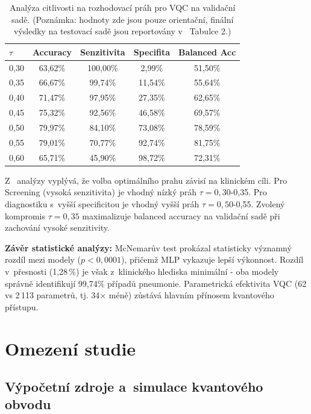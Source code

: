 \documentclass[12pt, a4paper]{report}
\begin{document}
\begin{table}[htbp]
    \centering
    \caption{Analýza citlivosti na rozhodovací práh pro VQC na validační sadě. (Poznámka: hodnoty zde jsou pouze orientační, finální výsledky na testovací sadě jsou reportovány v ~Tabulce 2.)}
    \label{tab:threshold_sensitivity}
    \begin{tabular}{|l|c|c|c|c|}
        \hline
        \textbf{$\tau$} & \textbf{Accuracy} & \textbf{Senzitivita} & \textbf{Specifita} & \textbf{Balanced Acc} \\
        \hline
        0{,}30 & 63{,}62\% & 100{,}00\% & 2{,}99\% & 51{,}50\% \\ \hline
        0{,}35 & 66{,}67\% & 99{,}74\% & 11{,}54\% & 55{,}64\% \\ \hline
        0{,}40 & 71{,}47\% & 97{,}95\% & 27{,}35\% & 62{,}65\% \\ \hline
        0{,}45 & 75{,}32\% & 92{,}56\% & 46{,}58\% & 69{,}57\% \\ \hline
        0{,}50 & 79{,}97\% & 84{,}10\% & 73{,}08\% & 78{,}59\% \\ \hline
        0{,}55 & 79{,}01\% & 70{,}77\% & 92{,}74\% & 81{,}75\% \\ \hline
        0{,}60 & 65{,}71\% & 45{,}90\% & 98{,}72\% & 72{,}31\% \\
    \end{tabular}
\end{table}

Z ~analýzy vyplývá, že volba optimálního prahu závisí na klinickém cíli. Pro Screening (vysoká senzitivita) je vhodný nízký práh $\tau = 0{,}30$-0{,}35. Pro diagnostiku s~vyšší specificitou je vhodný vyšší práh $\tau = 0{,}50$-0{,}55. Zvolený kompromis $\tau = 0{,}35$ maximalizuje balanced accuracy na validační sadě při zachování vysoké senzitivity.

\textbf{Závěr statistické analýzy:} McNemarův test prokázal statisticky významný rozdíl mezi modely ($p < 0{,}0001$), přičemž MLP vykazuje lepší výkonnost. Rozdíl v~přesnosti (1,28\,\%) je však z~klinického hlediska minimální - oba modely správně identifikují 99,74\% případů pneumonie. Parametrická efektivita VQC (62 vs 2\,113 parametrů, tj. 34× méně) zůstává hlavním přínosem kvantového přístupu.

\section{Omezení studie} \label{sec:omezeni}

\subsection{Výpočetní zdroje a~simulace kvantového obvodu}
\end{document}
